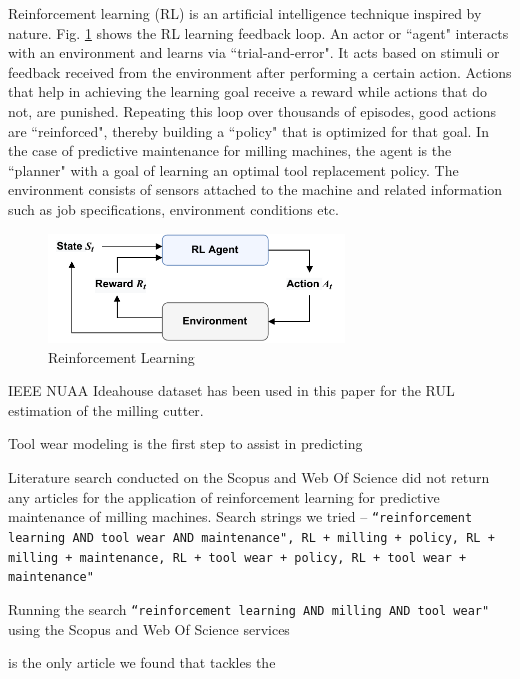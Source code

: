 \documentclass[a4paper, 12pt]{article}
\begin{document}
Reinforcement learning (RL) is an artificial intelligence technique inspired by nature. Fig. \ref{fig:RL-loop} \citep{barto2018} shows the RL learning feedback loop. An actor or ``agent" interacts with an environment and learns via ``trial-and-error". It acts based on stimuli or feedback received from the environment after performing a certain action. Actions that help in achieving the learning goal receive a reward while actions that do not, are punished. Repeating this loop over thousands of episodes, good actions are ``reinforced", thereby building a ``policy" that is optimized for that goal. In the case of predictive maintenance for milling machines, the agent is the ``planner" with a goal of learning an optimal tool replacement policy. The environment consists of sensors attached to the machine and related information such as job specifications, environment conditions etc.

\begin{figure}[!h]
	\centering
	\includegraphics[width=0.7\textwidth]{RL-loop.pdf}
	\caption{Reinforcement Learning}
	\label{fig:RL-loop}
\end{figure}




IEEE NUAA Ideahouse dataset has been used in this paper for the RUL estimation of the milling cutter. \cite{NUAA-data-set}



Tool wear modeling is the first step to assist in predicting 


Literature search conducted on the Scopus\texttrademark{} and Web Of Science\texttrademark{} did not return any articles for the application of reinforcement learning for predictive maintenance of milling machines. Search strings we tried -- \texttt{``reinforcement learning AND tool wear AND maintenance", RL + milling + policy, RL + milling + maintenance, RL + tool wear + policy, RL + tool wear + maintenance"} 

Running the search \texttt{``reinforcement learning AND milling AND tool wear"} using the Scopus\texttrademark{} and Web Of Science\texttrademark{} services 

\cite{dai2021reinforcement} is the only article we found that tackles the 
\end{document}
